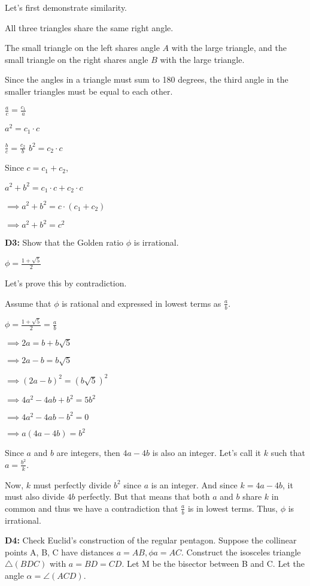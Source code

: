 \documentclass{article}
\begin{document}
Let's first demonstrate similarity.

All three triangles share the same right angle.

The small triangle on the left shares angle $A$ with the large triangle, and the
small triangle on the right shares angle $B$ with the large triangle.

Since the angles in a triangle must sum to 180 degrees, the third angle in the smaller
triangles must be equal to each other.

$\frac{a}{c} = \frac{c_1}{a}$

$a^2 = c_1 \cdot c$

$\frac{b}{c} = \frac{c_2}{b}$
$b^2 = c_2 \cdot c$

Since $c = c_1 + c_2$,

$a^2 + b^2 = c_1 \cdot c + c_2 \cdot c$

$\implies a^2 + b^2 = c \cdot (c_1 + c_2)$

$\implies a^2 + b^2 = c^2$


\textbf{D3:} Show that the Golden ratio $\phi$ is irrational.

$\phi = \frac{1 + \sqrt{5}}{2}$

Let's prove this by contradiction.

Assume that $\phi$ is rational and expressed in lowest terms as $\frac{a}{b}$.

$\phi = \frac{1 + \sqrt{5}}{2} = \frac{a}{b}$

$\implies 2a = b + b \sqrt{5}$

$\implies 2a - b = b \sqrt{5}$

$\implies (2a - b)^2 = (b \sqrt{5})^2$

$\implies 4 a^2 - 4 a b + b^2 = 5 b^2$

$\implies 4 a^2 - 4 a b - b^2 = 0$

$\implies a(4a - 4b) = b^2$

Since $a$ and $b$ are integers, then $4a - 4b$ is also an integer.
Let's call it $k$ such that $a = \frac{b^2}{k}$.

Now, $k$ must perfectly divide $b^2$ since $a$ is an integer. And since $k = 4a - 4b$,
it must also divide $4b$ perfectly. But that means that both $a$ and $b$
share $k$ in common and thus we have a contradiction that $\frac{a}{b}$ is
in lowest terms. Thus, $\phi$ is irrational.


\textbf{D4:} Check Euclid's construction of the regular pentagon.
Suppose the collinear points A, B, C have distances
$a = AB, \phi a = AC$. Construct the isosceles
triangle $\triangle (BDC)$ with $a = BD = CD$.
Let M be the bisector between B and C.
Let the angle $\alpha = \angle (ACD)$.
\end{document}
